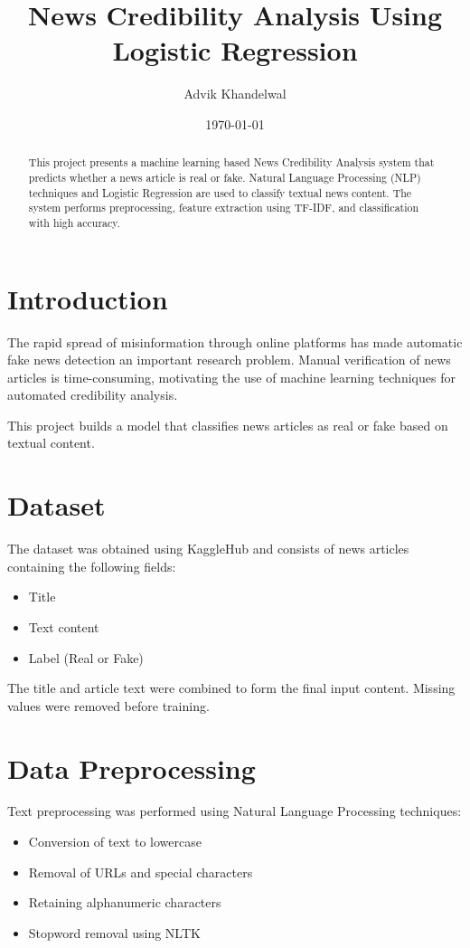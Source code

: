 \documentclass[12pt]{article}
\title{News Credibility Analysis Using Logistic Regression}
\author{Advik Khandelwal}
\date{\today}
\begin{document}
\maketitle

\begin{abstract}
This project presents a machine learning based News Credibility Analysis
system that predicts whether a news article is real or fake. Natural
Language Processing (NLP) techniques and Logistic Regression are used
to classify textual news content. The system performs preprocessing,
feature extraction using TF-IDF, and classification with high accuracy.
\end{abstract}

\section{Introduction}

The rapid spread of misinformation through online platforms has made
automatic fake news detection an important research problem. Manual
verification of news articles is time-consuming, motivating the use
of machine learning techniques for automated credibility analysis.

This project builds a model that classifies news articles as real or fake
based on textual content.

\section{Dataset}

The dataset was obtained using KaggleHub and consists of news articles
containing the following fields:

\begin{itemize}
\item Title
\item Text content
\item Label (Real or Fake)
\end{itemize}

The title and article text were combined to form the final input content.
Missing values were removed before training.

\section{Data Preprocessing}

Text preprocessing was performed using Natural Language Processing
techniques:

\begin{itemize}
\item Conversion of text to lowercase
\item Removal of URLs and special characters
\item Retaining alphanumeric characters
\item Stopword removal using NLTK
\end{itemize}
\end{document}
